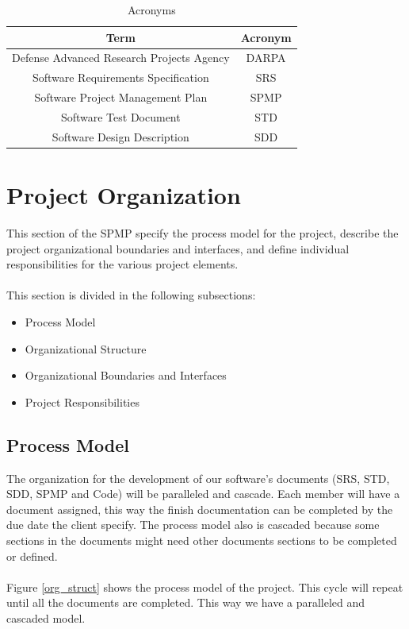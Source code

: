 \documentclass[12pt]{article}
\begin{document}
\begin{table}[H]\centering
\begin{tabular}{|c|c|}
  \hline
  Term & Acronym \\
   \hline
  Defense Advanced Research Projects Agency  & DARPA \\
   \hline
  Software Requirements Specification & SRS \\
   \hline
    Software Project Management Plan & SPMP \\
   \hline
     Software Test Document & STD \\
   \hline
     Software Design Description & SDD \\
   \hline
\end{tabular}
\caption{Acronyms}
\end{table}

\section{Project Organization}
This section of the SPMP specify the process model for the project, describe the project organizational boundaries and interfaces, and define individual responsibilities for the various project elements.\\\\
This section is divided in the following subsections:
\begin{itemize}
  \item Process Model 
  \item Organizational Structure 
  \item Organizational Boundaries and Interfaces 
  \item Project Responsibilities 
\end{itemize}

\subsection{Process Model}
The organization for the development of our software's documents (SRS, STD, SDD, SPMP and Code) will be paralleled and cascade. Each member will have a document assigned, this way the finish documentation can be completed by the due date the client specify. The process model also is cascaded because some sections in the documents might need other documents sections to be completed or defined.\\\\
Figure \ref{org_struct} shows the process model of the project. This cycle will repeat until all the documents are completed. This way we have a paralleled and cascaded model.
\end{document}
